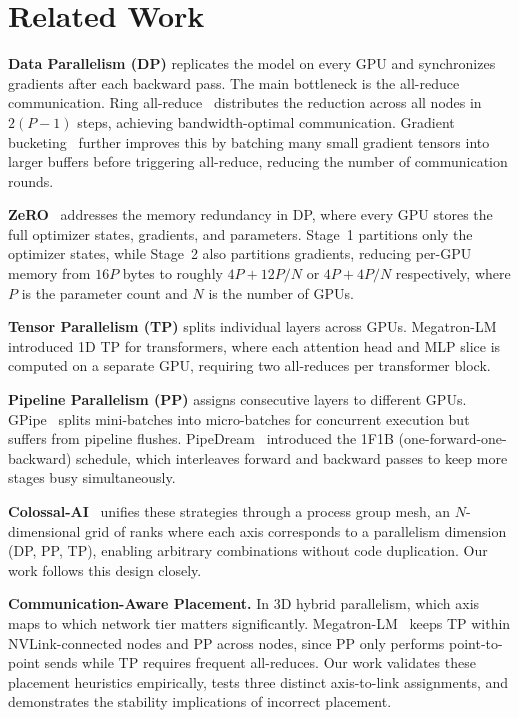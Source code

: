 \documentclass[conference]{IEEEtran}
\begin{document}
\section{Related Work}

\textbf{Data Parallelism (DP)} replicates the model on every GPU and synchronizes gradients after each backward pass. The main bottleneck is the all-reduce communication. Ring all-reduce~\cite{patarasuk2009bandwidth} distributes the reduction across all nodes in $2(P{-}1)$ steps, achieving bandwidth-optimal communication. Gradient bucketing~\cite{li2020pytorch} further improves this by batching many small gradient tensors into larger buffers before triggering all-reduce, reducing the number of communication rounds.

\textbf{ZeRO}~\cite{rajbhandari2019zero} addresses the memory redundancy in DP, where every GPU stores the full optimizer states, gradients, and parameters. Stage~1 partitions only the optimizer states, while Stage~2 also partitions gradients, reducing per-GPU memory from $16P$ bytes to roughly $4P + 12P/N$ or $4P + 4P/N$ respectively, where $P$ is the parameter count and $N$ is the number of GPUs.

\textbf{Tensor Parallelism (TP)} splits individual layers across GPUs. Megatron-LM~\cite{DBLP:journals/corr/abs-1909-08053} introduced 1D TP for transformers, where each attention head and MLP slice is computed on a separate GPU, requiring two all-reduces per transformer block.

\textbf{Pipeline Parallelism (PP)} assigns consecutive layers to different GPUs. GPipe~\cite{DBLP:journals/corr/abs-1811-06965} splits mini-batches into micro-batches for concurrent execution but suffers from pipeline flushes. PipeDream~\cite{10.1145/3341301.3359646} introduced the 1F1B (one-forward-one-backward) schedule, which interleaves forward and backward passes to keep more stages busy simultaneously.

\textbf{Colossal-AI}~\cite{10.1145/3605573.3605613} unifies these strategies through a process group mesh, an $N$-dimensional grid of ranks where each axis corresponds to a parallelism dimension (DP, PP, TP), enabling arbitrary combinations without code duplication. Our work follows this design closely.

\textbf{Communication-Aware Placement.} In 3D hybrid parallelism, which axis maps to which network tier matters significantly. Megatron-LM~\cite{DBLP:journals/corr/abs-1909-08053} keeps TP within NVLink-connected nodes and PP across nodes, since PP only performs point-to-point sends while TP requires frequent all-reduces. Our work validates these placement heuristics empirically, tests three distinct axis-to-link assignments, and demonstrates the stability implications of incorrect placement.
\end{document}
